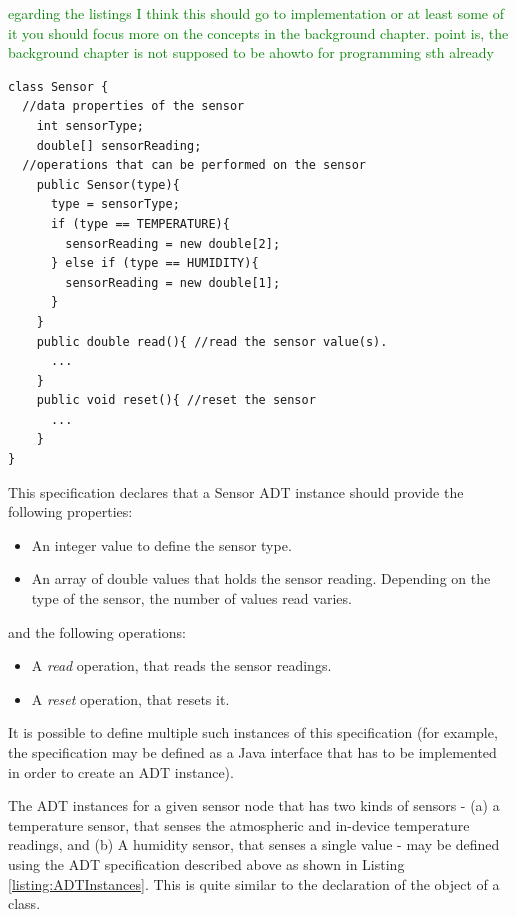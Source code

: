 \textcolor{green}{egarding the listings
I think this should go to implementation
or at least some of it
you should focus more on the concepts in the background chapter. point is, the
background chapter is not supposed to be ahowto for programming sth already}
  
\lstset{language = Java}  
 \begin{lstlisting}[frame=trbl, basewidth={0.55em, 0.6em}, captionpos=b, basicstyle=\ttfamily\footnotesize, breaklines, caption = Sensor ADT specification (reproduced from \cite{migliavacca_DADT:2006}), label = listing:ADTSpec ]
class Sensor {
  //data properties of the sensor 
    int sensorType;
    double[] sensorReading;
  //operations that can be performed on the sensor  
	public Sensor(type){
	  type = sensorType;
	  if (type == TEMPERATURE){
		sensorReading = new double[2];
	  }	else if (type == HUMIDITY){
		sensorReading = new double[1];
	  }
	}
    public double read(){ //read the sensor value(s).
	  ...
	} 
	public void reset(){ //reset the sensor
	  ...
	}
}
\end{lstlisting}

This specification declares that a Sensor ADT instance should provide the
following properties:
\begin{itemize}
\item An integer value to define the sensor type.   
\item An array of double values that holds the sensor reading. Depending on the
type of the sensor, the number of values read varies.
\end{itemize}

and the following operations:
\begin{itemize}
  \item A \emph{read} operation, that reads the sensor readings.
  \item A \emph{reset} operation, that resets it.
\end{itemize}

It is possible to define multiple such instances of this specification (for
example, the specification may be defined as a Java interface that has to
be implemented in order to create an ADT instance).

The ADT instances for a given sensor node that has two kinds of
sensors - (a) a temperature sensor, that senses the atmospheric and in-device
  temperature readings, and (b) A humidity sensor, that senses a single value -
  may be defined using the ADT specification described above as shown in
  Listing \ref{listing:ADTInstances}. This is quite similar to the declaration
  of the object of a class.  

